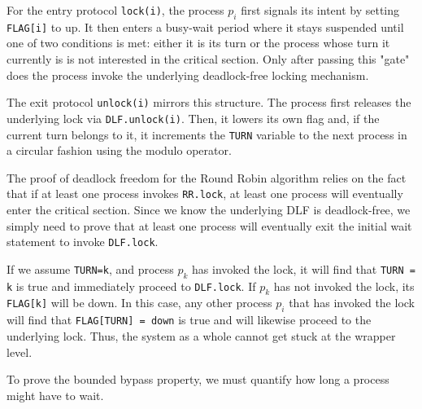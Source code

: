 For the entry protocol \texttt{lock(i)}, the process $p_i$ first signals its intent by setting \texttt{FLAG[i]} to up. It then enters a busy-wait period where it stays suspended until one of two conditions is met: either it is its turn or the process whose turn it currently is is not interested in the critical section. Only after passing this "gate" does the process invoke the underlying deadlock-free locking mechanism.

The exit protocol \texttt{unlock(i)} mirrors this structure. The process first releases the underlying lock via \texttt{DLF.unlock(i)}. Then, it lowers its own flag and, if the current turn belongs to it, it increments the \texttt{TURN} variable to the next process in a circular fashion using the modulo operator.

The proof of deadlock freedom for the Round Robin algorithm relies on the fact that if at least one process invokes \texttt{RR.lock}, at least one process will eventually enter the critical section. Since we know the underlying DLF is deadlock-free, we simply need to prove that at least one process will eventually exit the initial wait statement to invoke \texttt{DLF.lock}.

If we assume \texttt{TURN=k}, and process $p_k$ has invoked the lock, it will find that \texttt{TURN = k} is true and immediately proceed to \texttt{DLF.lock}. If $p_k$ has not invoked the lock, its \texttt{FLAG[k]} will be down. In this case, any other process $p_i$ that has invoked the lock will find that \texttt{FLAG[TURN] = down} is true and will likewise proceed to the underlying lock. Thus, the system as a whole cannot get stuck at the wrapper level.

To prove the bounded bypass property, we must quantify how long a process might have to wait.

